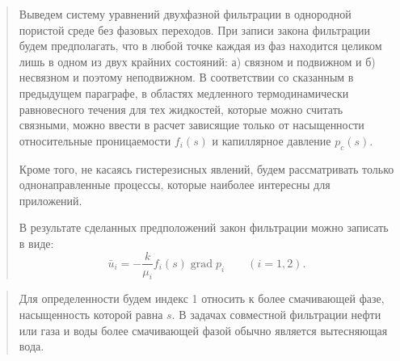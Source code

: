 \documentclass[12pt,a4paper]{article}
\DeclareMathOperator{\grad}{grad}
\begin{document}
\begin{quote}\sloppy
Выведем систему уравнений двухфазной фильтрации в однородной пористой среде без фазовых переходов. При записи закона фильтрации будем предполагать, что в любой точке каждая из фаз находится целиком лишь в одном из двух крайних состояний: а) связном и подвижном и б) несвязном и поэтому неподвижном. В соответствии со сказанным в предыдущем параграфе, в областях медленного термодинамически равновесного течения для тех жидкостей, которые можно считать связными, можно ввести в расчет зависящие только от насыщенности относительные проницаемости $f_i(s)$ и капиллярное давление $p_c(s)$.

Кроме того, не касаясь гистерезисных явлений, будем рассматривать только однонаправленные процессы, которые наиболее интересны для приложений.

В результате сделанных предположений закон фильтрации можно записать в виде:
\begin{equation}\bar u_i=-\frac{k}{\mu_i}f_i(s)\grad p_i\qquad(i=1,2).\tag{VI.2.1}\label{q11:eq-VI-2-1}\end{equation}
\par\nobreak{}\par
\end{quote}

\begin{quote}\sloppy
Для определенности будем индекс 1 относить к более смачивающей фазе, насыщенность которой равна $s$. В задачах совместной фильтрации нефти или газа и воды более смачивающей фазой обычно является вытесняющая вода.
\par\nobreak{}\par
\end{quote}
\end{document}
